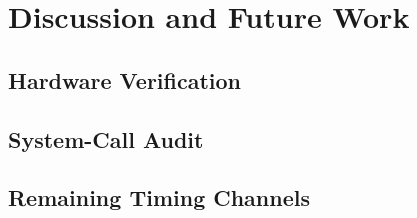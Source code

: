 \section{Discussion and Future Work}
\label{sec:discussion}


\subsection{Hardware Verification}
\label{sub:hw_verification}


\subsection{System-Call Audit}
\label{sub:syscall_audit}


\subsection{Remaining Timing Channels}
\label{sub:remaining_channels}

